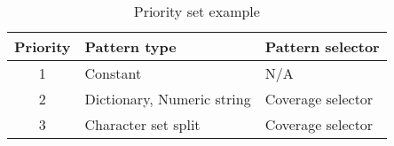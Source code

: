 \begin{table}[h]
\centering
\begin{tabular}{@{}cll@{}}
\toprule
\multicolumn{1}{l}{Priority} & Pattern type               & Pattern selector  \\ \midrule
1                            & Constant                   & N/A               \\
2                            & Dictionary, Numeric string & Coverage selector \\
3                            & Character set split        & Coverage selector \\ \bottomrule
\end{tabular}
\caption{Priority set example}
\label{tab:ps:priority:table1}
\end{table}
